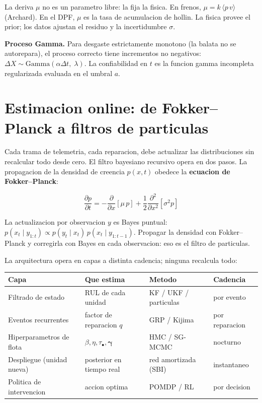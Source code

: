 \documentclass[10.5pt,a4paper]{article}
\begin{document}
La deriva $\mu$ no es un parametro libre: la fija la fisica. En frenos, $\mu = k\,\langle p\,v \rangle$ (Archard). En el DPF, $\mu$ es la tasa de acumulacion de hollin. La fisica provee el prior; los datos ajustan el residuo y la incertidumbre $\sigma$.

\textbf{Proceso Gamma.} Para desgaste estrictamente monotono (la balata no se autorepara), el proceso correcto tiene incrementos no negativos: $\Delta X \sim \mathrm{Gamma}(\alpha\Delta t,\;\lambda)$. La confiabilidad en $t$ es la funcion gamma incompleta regularizada evaluada en el umbral $a$.

\section{Estimacion online: de Fokker--Planck a filtros de particulas}

Cada trama de telemetria, cada reparacion, debe actualizar las distribuciones sin recalcular todo desde cero. El filtro bayesiano recursivo opera en dos pasos. La propagacion de la densidad de creencia $p(x,t)$ obedece la \textbf{ecuacion de Fokker--Planck}:

\begin{mathbox}
$$\frac{\partial p}{\partial t} = -\frac{\partial}{\partial x}[\mu\,p] + \frac{1}{2}\frac{\partial^2}{\partial x^2}[\sigma^2 p]$$

La actualizacion por observacion $y$ es Bayes puntual: $p(x_t\mid y_{1:t}) \propto p(y_t\mid x_t)\,p(x_t\mid y_{1:t-1})$.
Propagar la densidad con Fokker--Planck y corregirla con Bayes en cada observacion: eso es el filtro de particulas.
\end{mathbox}

La arquitectura opera en capas a distinta cadencia; ninguna recalcula todo:

\medskip
\begin{center}
\small
\begin{tabular}{@{}p{3.5cm}p{3.5cm}p{3.5cm}p{2.4cm}@{}}
\toprule
\textbf{Capa} & \textbf{Que estima} & \textbf{Metodo} & \textbf{Cadencia} \\
\midrule
Filtrado de estado & RUL de cada unidad & KF / UKF / particulas & por evento \\
Eventos recurrentes & factor de reparacion $q$ & GRP / Kijima & por reparacion \\
Hiperparametros de flota & $\beta,\eta,\tau_\bullet,\boldsymbol\gamma$ & HMC / SG-MCMC & nocturno \\
Despliegue (unidad nueva) & posterior en tiempo real & red amortizada (SBI) & instantaneo \\
Politica de intervencion & accion optima & POMDP / RL & por decision \\
\bottomrule
\end{tabular}
\end{center}
\end{document}
